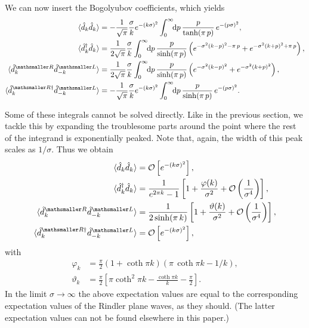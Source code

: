 \documentclass[11pt, a4paper]{article}
\newcommand{\si}{{\sigma}}
\newcommand{\ms}{\mathsmaller}
\begin{document}
We can now insert the Bogolyubov coefficients, which yields
\begin{align}
\label{eq:specificE}
\begin{aligned}
\langle \hat d_k \hat d_k \rangle  &=-\frac{1}{\sqrt{\pi}}\frac{\si}{k}e^{-(k\si)^2}\int_0^\infty\! \!\mathrm{d}p\, \frac{p}{\tanh(\pi\,p )}\, e^{-(p\si)^2},
\\
\langle \hat d_k^\dagger \hat d_k \rangle &=\frac{1}{2\sqrt{\pi}}\frac{\si}{k}\int_0^\infty\!\!\mathrm{d}p\,\frac{p}{\sinh(\pi\, p )}\left(e^{-\si^2(k-p)^2-\pi\, p }+e^{-\si^2(k+p)^2+\pi\, p }\right),
\\
\langle \hat d_k^{\ms R} \hat d_{-k}^{\ms L} \rangle &=\frac{1}{2\sqrt{\pi}}\frac{\si}{k}\int_0^\infty\!\!\mathrm{d}p\, \frac{p}{\sinh(\pi\,p )} \left(e^{-\si^2(k-p)^2}+e^{-\si^2(k+p)^2}\right),
\\
\langle \hat d_k^{\ms R\dagger}\hat d_{-k}^{\ms L}\rangle  &=-\frac{1}{\sqrt{\pi}}\frac{\si}{k} e^{-\left(k\si\right)^2}\int_0^\infty\! \!\mathrm{d}p\, \frac{p}{\sinh(\pi\,p )}\,e^{-\left(p\si\right)^2}.
\end{aligned}
\end{align}

Some of these integrals cannot be solved directly. Like in the previous section, we tackle this by expanding the troublesome parts around the point where the rest of the integrand is exponentially peaked. Note that, again, the width of this peak scales as $1/\si$. Thus we obtain
\begin{equation}
\label{eq:calcExpectationValuesOfAPairOfRindlerWavepackets}
\begin{aligned}
\langle \hat d_k \hat d_k \rangle 
&=\mathcal O\left[e^{-(k\si)^2}\right],
\\
\langle \hat d_k^\dagger \hat d_k \rangle &=\frac{1}{e^{2\pi k }-1}\left[1+\frac{\varphi(k )}{ \si^2}+\mathcal O\left(\frac{1}{\si^4}\right)\right],
\\
\langle \hat d_k^{\ms R} \hat d_{-k}^{\ms L} \rangle &=\frac{1}{2\sinh(\pi\,k )}\left[1+\frac{\vartheta(k )}{\si^2}+\mathcal O\left(\frac{1}{\si^4}\right)\right],
\\
\langle \hat d_k^{\ms R\dagger}\hat d_{-k}^{\ms L}\rangle  &=\mathcal O\left[e^{-(k\si)^2}\right],
\end{aligned}
\end{equation}
with
\begin{equation*}
\begin{aligned}
\varphi_k&=\frac{\pi}{2}  \left(1+\coth \pi k \right) \left(\pi\, \coth\pi k-1/k\right),
\\
\vartheta_k&=\frac{\pi}{2}\left[\pi  \coth ^2 \pi k -\frac{ \coth \pi  k}{k}-\frac{\pi }{2}\right].
\end{aligned}
\end{equation*}
In the limit $\si\to\infty$ the above expectation values are equal to the corresponding expectation values of the Rindler plane waves, as they should. (The latter expectation values can not be found elsewhere in this paper.)
\end{document}
